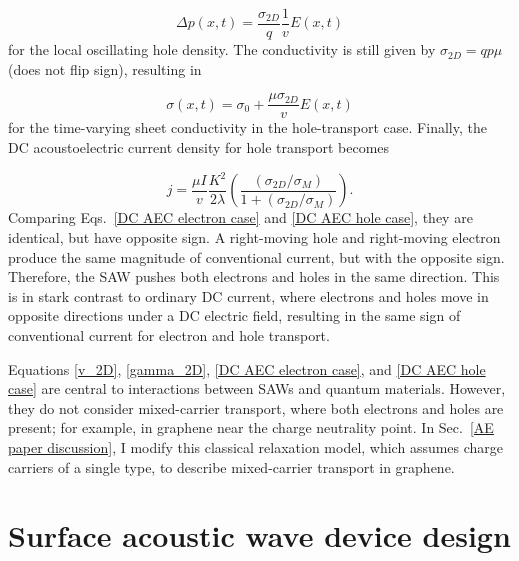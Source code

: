 \documentclass[double,12pt,1in,seploa]{beavtex}
\let\Oldsection\section
\renewcommand{\section}{\FloatBarrier\Oldsection}
\begin{document}
\begin{equation}
    \Delta p(x,t) = \frac{\sigma_{2D}}{q} \frac{1}{v}E(x,t)
\end{equation}
for the local oscillating hole density. The conductivity is still given by $\sigma_{2D} = q p \mu$ (does not flip sign), resulting in

\begin{equation}
    \sigma(x,t)= \sigma_0 + \frac{\mu \sigma_{2D}}{v}E(x,t)
\end{equation}
for the time-varying sheet conductivity in the hole-transport case. Finally, the DC acoustoelectric current density for hole transport becomes

\begin{equation}
    j = \frac{\mu I}{v} \frac{K^2}{2\lambda}(\frac{(\sigma_{2D}/\sigma_M)}{1+(\sigma_{2D}/\sigma_M)}). \label{DC AEC hole case}
\end{equation}
Comparing Eqs.\ \ref{DC AEC electron case} and \ref{DC AEC hole case}, they are identical, but have opposite sign. A right-moving hole and right-moving electron produce the same magnitude of conventional current, but with the opposite sign. Therefore, the SAW pushes both electrons and holes in the same direction. This is in stark contrast to ordinary DC current, where electrons and holes move in opposite directions under a DC electric field, resulting in the same sign of conventional current for electron and hole transport.

Equations \ref{v_2D}, \ref{gamma_2D}, \ref{DC AEC electron case}, and \ref{DC AEC hole case} are central to interactions between SAWs and quantum materials. However, they do not consider mixed-carrier transport, where both electrons and holes are present; for example, in graphene near the charge neutrality point. In Sec.\ \ref{AE paper discussion}, I modify this classical relaxation model, which assumes charge carriers of a single type, to describe mixed-carrier transport in graphene.


\section{Surface acoustic wave device design} \label{SAW device design}
\end{document}
